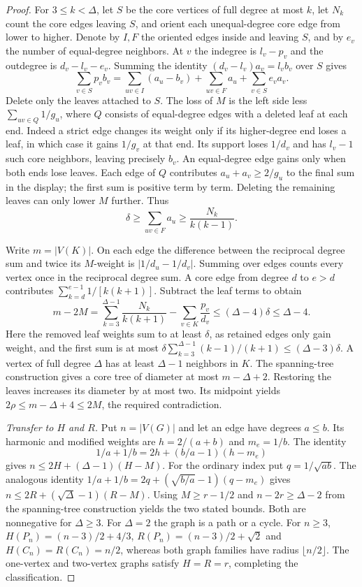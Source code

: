 \documentclass[11pt,a4paper]{article}
\begin{document}
\begin{proof}
For $3\le k<\Delta$, let $S$ be the core vertices of full degree at
most $k$, let $N_k$ count the core edges leaving $S$, and orient each
unequal-degree core edge from lower to higher. Denote by $I,F$ the
oriented edges inside and leaving $S$, and by $e_v$ the number of
equal-degree neighbors. At $v$ the indegree is $l_v-p_v$ and the
outdegree is $d_v-l_v-e_v$. Summing the identity
$(d_v-l_v)a_v=l_vb_v$ over $S$ gives
\[
 \sum_{v\in S}p_v b_v
  =\sum_{uv\in I}(a_u-b_v)+\sum_{uv\in F}a_u+\sum_{v\in S}e_v a_v.
\]
Delete only the leaves attached to $S$. The loss of $M$ is the left
side less $\sum_{uv\in Q}1/g_u$, where $Q$ consists of equal-degree
edges with a deleted leaf at each end. Indeed a strict edge changes its
weight only if its higher-degree end loses a leaf, in which case it gains
$1/g_v$ at that end. Its support loses $1/d_v$ and has $l_v-1$ such
core neighbors, leaving precisely $b_v$. An equal-degree edge gains
only when both ends lose leaves.
Each edge of $Q$ contributes $a_u+a_v\ge2/g_u$ to the final sum in the
display; the first sum is positive term by term. Deleting the remaining
leaves can only lower $M$ further. Thus
\[
 \delta\ge\sum_{uv\in F}a_u\ge \frac{N_k}{k(k-1)}.
\]

Write $m=|V(K)|$. On each edge the difference between the reciprocal
degree sum and twice its $M$-weight is $|1/d_u-1/d_v|$. Summing over
edges counts every vertex once in the reciprocal degree sum.
A core edge from degree $d$ to $e>d$ contributes
$\sum_{k=d}^{e-1}1/[k(k+1)]$. Subtract the leaf terms to obtain
\[
 m-2M=\sum_{k=3}^{\Delta-1}\frac{N_k}{k(k+1)}
          -\sum_{v\in K}\frac{p_v}{d_v}\le(\Delta-4)\delta\le\Delta-4.
\]
Here the removed leaf weights sum to at least $\delta$, as retained
edges only gain weight, and the first sum is at most
$\delta\sum_{k=3}^{\Delta-1}(k-1)/(k+1)\le(\Delta-3)\delta$.
A vertex of full degree $\Delta$ has at least $\Delta-1$ neighbors
in $K$. The spanning-tree construction gives a core tree of diameter
at most $m-\Delta+2$. Restoring the leaves increases its diameter by
at most two. Its midpoint yields $2\rho\le m-\Delta+4\le2M$, the
required contradiction.

\emph{Transfer to $H$ and $R$.} Put $n=|V(G)|$ and let an edge have
degrees $a\le b$. Its harmonic and modified weights are
$h=2/(a+b)$ and $m_e=1/b$. The identity
\[
 1/a+1/b=2h+(b/a-1)(h-m_e)
\]
gives $n\le2H+(\Delta-1)(H-M)$. For the ordinary index put
$q=1/\sqrt{ab}$. The analogous identity
$1/a+1/b=2q+(\sqrt{b/a}-1)(q-m_e)$ gives
$n\le2R+(\sqrt\Delta-1)(R-M)$. Using
$M\ge r-1/2$ and $n-2r\ge\Delta-2$ from the spanning-tree
construction yields the two stated bounds. Both are nonnegative for
$\Delta\ge3$. For $\Delta=2$ the graph is a path or a cycle.
For $n\ge3$,
$H(P_n)=(n-3)/2+4/3$, $R(P_n)=(n-3)/2+\sqrt2$ and
$H(C_n)=R(C_n)=n/2$, whereas both graph families have radius
$\lfloor n/2\rfloor$. The one-vertex and two-vertex graphs satisfy
$H=R=r$, completing the classification.
\end{proof}
\end{document}
